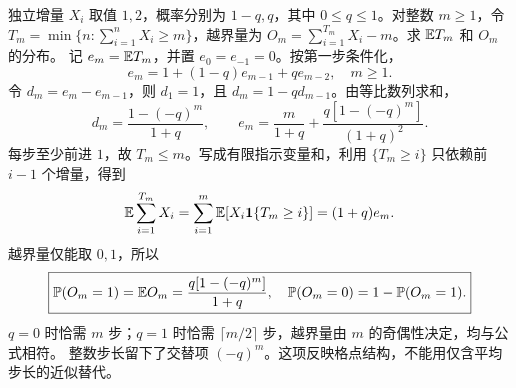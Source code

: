 独立增量 $X_i$ 取值 $1,2$，概率分别为 $1-q,q$，其中 $0\le q\le1$。对整数 $m\ge1$，令 $T_m=\min\{n:\sum_{i=1}^nX_i\ge m\}$，越界量为 $O_m=\sum_{i=1}^{T_m}X_i-m$。求 $\mathbb{E} T_m$ 和 $O_m$ 的分布。
\solution 记 $e_m=\mathbb{E} T_m$，并置 $e_0=e_{-1}=0$。按第一步条件化，
\[
e_m=1+(1-q)e_{m-1}+qe_{m-2},\quad m\ge1.
\]
令 $d_m=e_m-e_{m-1}$，则 $d_1=1$，且 $d_m=1-qd_{m-1}$。由等比数列求和，
\[
d_m=\frac{1-(-q)^m}{1+q},\qquad
\boxed{e_m=\frac m{1+q}+\frac{q[1-(-q)^m]}{(1+q)^2}.}
\]
每步至少前进 $1$，故 $T_m\le m$。写成有限指示变量和，利用 $\{T_m\ge i\}$ 只依赖前 $i-1$ 个增量，得到
\[
\mathbb{E}\sum_{i=1}^{T_m}X_i
=\sum_{i=1}^m\mathbb{E}[X_i\mathbf{1}\{T_m\ge i\}]
=(1+q)e_m.
\]
越界量仅能取 $0,1$，所以
\[
\boxed{\mathbb{P}(O_m=1)=\mathbb{E} O_m
=\frac{q[1-(-q)^m]}{1+q},\quad
\mathbb{P}(O_m=0)=1-\mathbb{P}(O_m=1).}
\]
$q=0$ 时恰需 $m$ 步；$q=1$ 时恰需 $\lceil m/2\rceil$ 步，越界量由 $m$ 的奇偶性决定，均与公式相符。
\insight 整数步长留下了交替项 $(-q)^m$。这项反映格点结构，不能用仅含平均步长的近似替代。
